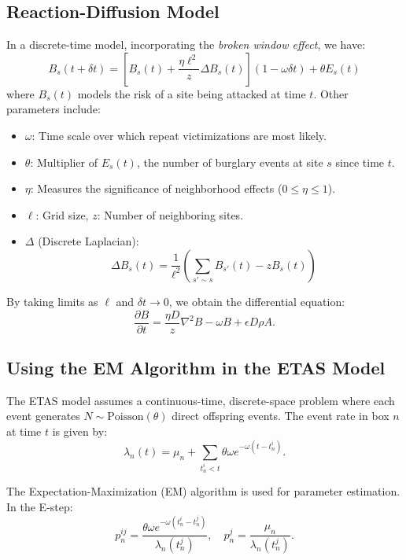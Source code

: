 \documentclass{article}
\begin{document}
\subsection{Reaction-Diffusion Model}
In a discrete-time model, incorporating the \textit{broken window effect}, we have:
\begin{equation}
    B_s(t + \delta t) = \left[ B_s(t) + \frac{\eta \ell^2}{z} \Delta B_s(t) \right] (1 - \omega \delta t) + \theta E_s(t)
\end{equation}
where $B_s(t)$ models the risk of a site being attacked at time $t$. Other parameters include:
\begin{itemize}
    \item $\omega$: Time scale over which repeat victimizations are most likely.
    \item $\theta$: Multiplier of $E_s(t)$, the number of burglary events at site $s$ since time $t$.
    \item $\eta$: Measures the significance of neighborhood effects ($0 \leq \eta \leq 1$).
    \item $\ell$: Grid size, $z$: Number of neighboring sites.
    \item $\Delta$ (Discrete Laplacian):
    \begin{equation}
        \Delta B_s(t) = \frac{1}{\ell^2} \left( \sum_{s' \sim s} B_{s'}(t) - z B_s(t) \right)
    \end{equation}
\end{itemize}

By taking limits as $\ell$ and $\delta t \to 0$, we obtain the differential equation:
\begin{equation}
    \frac{\partial B}{\partial t} = \frac{\eta D}{z} \nabla^2 B - \omega B + \epsilon D \rho A.
\end{equation}

\subsection{Using the EM Algorithm in the ETAS Model}
The ETAS model assumes a continuous-time, discrete-space problem where each event generates $N \sim \text{Poisson}(\theta)$ direct offspring events. The event rate in box $n$ at time $t$ is given by:
\begin{equation}
    \lambda_n(t) = \mu_n + \sum_{t_n^i < t} \theta \omega e^{-\omega (t - t_n^i)}.
\end{equation}

The Expectation-Maximization (EM) algorithm is used for parameter estimation. In the E-step:
\begin{equation}
    p_n^{ij} = \frac{\theta \omega e^{-\omega (t_n^i - t_n^j)}}{\lambda_n(t_n^j)}, \quad p_n^j = \frac{\mu_n}{\lambda_n(t_n^j)}.
\end{equation}
\end{document}
